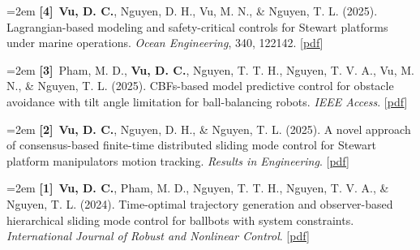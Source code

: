 \documentclass[10pt]{extarticle}
\newcommand{\pubitem}[2]{%
	\noindent\hangindent=2em\hangafter=1 \textbf{[#1]}~#2\par\vspace{0.6em}%
}
\let\oldhref\href
\renewcommand{\href}[2]{\oldhref{#1}{\ul{#2}}}
\begin{document}
	\pubitem{4}{{\textbf{Vu, D. C.}}, Nguyen, D. H., Vu, M. N., \& Nguyen, T. L. (2025). Lagrangian-based modeling and safety-critical controls for Stewart platforms under marine operations. \textit{Ocean Engineering}, 340, 122142. [\href{https://doi.org/10.1016/j.oceaneng.2025.122142}{pdf}]}

	\pubitem{3}{Pham, M. D., {\textbf{Vu, D. C.}}, Nguyen, T. T. H., Nguyen, T. V. A., Vu, M. N., \& Nguyen, T. L. (2025). CBFs-based model predictive control for obstacle avoidance with tilt angle limitation for ball-balancing robots. \textit{IEEE Access}. [\href{https://doi.org/10.1109/ACCESS.2025.3567474}{pdf}]}

	\pubitem{2}{{\textbf{Vu, D. C.}}, Nguyen, D. H., \& Nguyen, T. L. (2025). A novel approach of consensus-based finite-time distributed sliding mode control for Stewart platform manipulators motion tracking. \textit{Results in Engineering}. [\href{https://doi.org/10.1016/j.rineng.2024.103872}{pdf}]}

	\pubitem{1}{{\textbf{Vu, D. C.}}, Pham, M. D., Nguyen, T. T. H., Nguyen, T. V. A., \& Nguyen, T. L. (2024). Time-optimal trajectory generation and observer-based hierarchical sliding mode control for ballbots with system constraints. \textit{International Journal of Robust and Nonlinear Control}. [\href{https://doi.org/10.1002/rnc.7358}{pdf}]}



	
\end{document}
